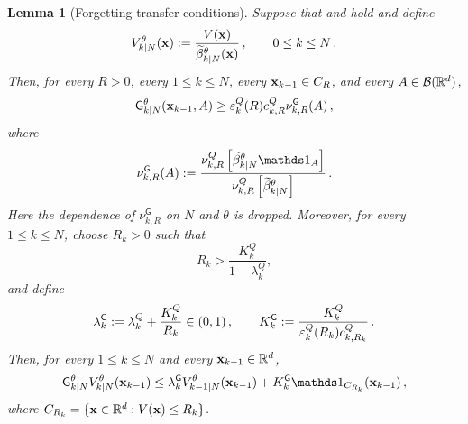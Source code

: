\documentclass[11pt]{article}
\theoremstyle{plain}
\newtheorem{lemma}[theorem]{Lemma}
\theoremstyle{definition}
\theoremstyle{remark}
\begin{document}
\begin{lemma}[Forgetting transfer conditions]
\label{lem:harris_forward_smoothing}
Suppose that
 and 
hold and define
$$
V_{k|N}^{\theta}(\mathbf{x}) := \frac{V(\mathbf{x})}{\widetilde\beta_{k|N}^{\theta}(\mathbf{x})} \,, \qquad 0\le k\le N \,.
$$
Then, for every $R>0$, every $1\le k\le N$, every
$\mathbf{x}_{k-1}\in C_R$, and every $A\in\mathcal{B}(\mathbb{R}^d)$,
\begin{equation}
\label{eq:minorization_cond_G}
\fsmk{k}{N}[\theta][\x_{k-1}][A] \ge \varepsilon_k^Q(R) c_{k,R}^Q \nu_{k,R}^{\mathsf G}(A) \eqsp,
\end{equation}
where
$$
\nu_{k,R}^{\mathsf G}(A) \eqdef \frac{ \nu_{k,R}^Q \left[ \widetilde \beta_{k|N}^{\theta} \un_A \right]
}{
\nu_{k,R}^Q \left[ \widetilde \beta_{k|N}^{\theta} \right] } \eqsp.
$$
Here the dependence of $\nu_{k,R}^{\mathsf G}$ on $N$ and $\theta$ is dropped. Moreover, for every $1\le k\le N$, choose $R_k>0$ such that
$$
R_k > \frac{K_k^Q}{1 - \lambda_k^Q},
$$
and define
$$
\lambda_k^{\mathsf G} := \lambda_k^Q+\frac{K_k^Q}{R_k} \in(0,1) \,,
\qquad K_k^{\mathsf G} := \frac{K_k^Q}{ \varepsilon_k^Q(R_k) c_{k,R_k}^Q} \,.
$$
Then, for every $1\le k\le N$ and every $\mathbf{x}_{k-1} \in \mathbb{R}^d$,
\begin{equation}
\label{eq:drift_cond_G}
\fsmk{k}{N}[\theta] V_{k|N}^{\theta} (\x_{k-1}) \le \lambda_k^{\mathsf G} V_{k-1|N}^{\theta} (\x_{k-1}) +  K_k^{\mathsf G} \un_{C_{R_k}}(\x_{k-1}) \eqsp,
\end{equation}
where $C_{R_k} = \{ \mathbf{x} \in \mathbb{R}^d : V(\mathbf{x}) \leq R_k \}$.
\end{lemma}
\end{document}
